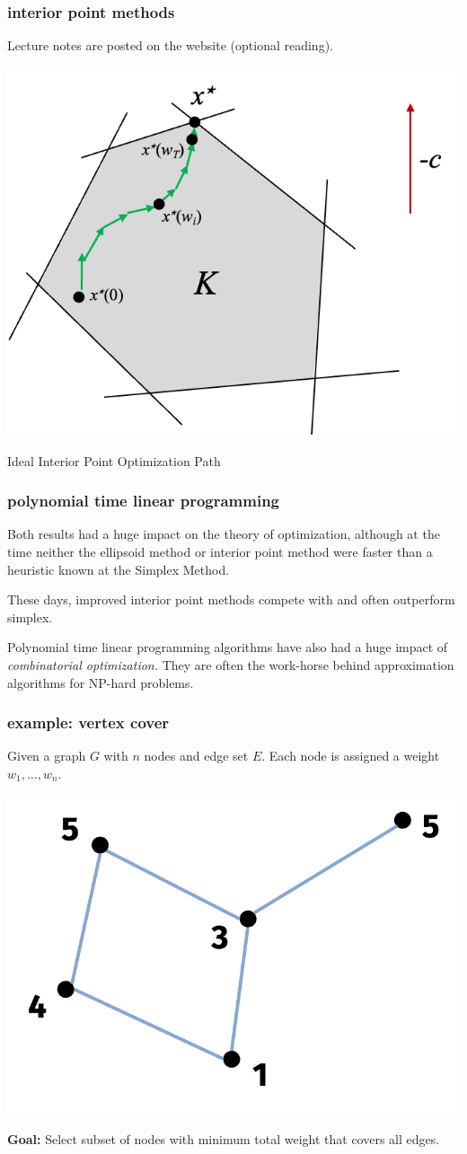 \documentclass[compress]{beamer}
\begin{document}
\begin{frame}[t]
	\frametitle{interior point methods}
	Lecture notes are posted on the website (optional reading).
	\begin{center}
		\includegraphics[width=.6\textwidth]{interior_point.png}
		
		Ideal Interior Point Optimization Path
	\end{center}
	
\end{frame}

\begin{frame}[t]
	\frametitle{polynomial time linear programming}
	Both results had a huge impact on the theory of optimization, although at the time neither the ellipsoid method or interior point method were faster than a heuristic known at the Simplex Method. 
	
	These days, improved interior point methods compete with and often outperform simplex.

	Polynomial time linear programming algorithms have also had a huge impact of \emph{combinatorial optimization.} They are often the work-horse behind approximation algorithms for NP-hard problems.  
\end{frame}

\begin{frame}[t]
	\frametitle{example: vertex cover}
	Given a graph $G$ with $n$ nodes and edge set $E$. Each node is assigned a weight $w_1, \ldots, w_n$.
	\begin{center}
		\includegraphics[width=.6\textwidth]{vertex_cover.png}
	\end{center}
	\textbf{Goal:} Select subset of nodes with minimum total weight that covers all edges.
\end{frame}
\end{document}
